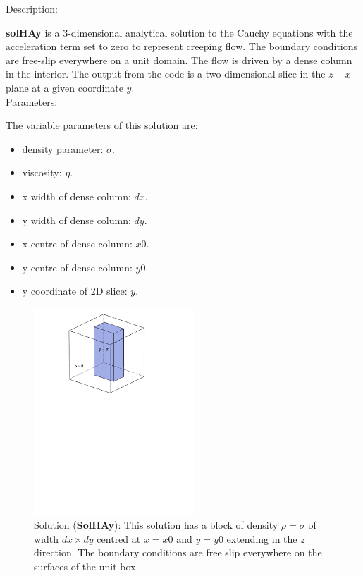   {\large \fontB Description:}
  
  {\bf solHAy} is a 3-dimensional analytical solution to the Cauchy equations with the acceleration term set to zero
  to represent creeping flow. The boundary conditions are free-slip everywhere on a unit domain. 
  The flow is driven by a dense column in the interior. The output from the code is a two-dimensional slice
  in the $z - x$ plane at a given coordinate $y$.
  \\

  {\large \fontB Parameters:}
 
  The variable parameters of this solution are:
  \begin{itemize}
    \item{density parameter: $ \sigma $.}
    \item{viscosity: $\eta$.}
    \item{x width of dense column: $dx$.}
    \item{y width of dense column: $dy$.}
    \item{x centre of dense column: $x0$.}
    \item{y centre of dense column: $y0$.}
    \item{y coordinate of 2D slice: $y$.}
    \end{itemize}

  \begin{figure}
    \includegraphics[width=6cm,clip]{../figs/figHA.pdf}
    \caption[Short caption]{\label{figHAy} 
      Solution ({\bf SolHAy}):
      This solution has a block of density $\rho = \sigma$
      of width $dx \times dy$ centred at $x=x0$ and $y=y0$    
       extending in the $z$ direction.
      The boundary conditions are free slip everywhere on the surfaces of the unit box.}
  \end{figure} 
  

